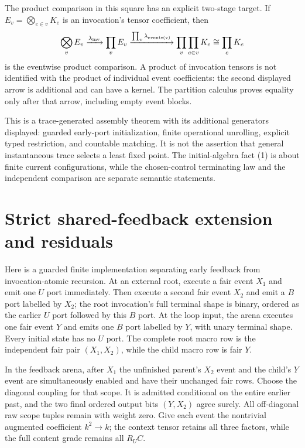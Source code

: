 \documentclass[11pt]{article}
\begin{document}
The product comparison in this square has an explicit two-stage target. If $E_v=\bigotimes_{e\in v}K_e$ is an invocation's tensor coefficient, then
\[
 \bigotimes_v E_v
 \xrightarrow{\lambda_{\rm inv}}\prod_v E_v
 \xrightarrow{\prod_v\lambda_{\rm events(v)}}
 \prod_v\prod_{e\in v}K_e\cong\prod_eK_e
\]
is the eventwise product comparison. A product of invocation tensors is not identified with the product of individual event coefficients: the second displayed arrow is additional and can have a kernel. The partition calculus proves equality only after that arrow, including empty event blocks.

This is a trace-generated assembly theorem with its additional generators displayed: guarded early-port initialization, finite operational unrolling, explicit typed restriction, and countable matching. It is not the assertion that general instantaneous trace selects a least fixed point. The initial-algebra fact (1) is about finite current configurations, while the chosen-control terminating law and the independent comparison are separate semantic statements.

\section{Strict shared-feedback extension and residuals}
Here is a guarded finite implementation separating early feedback from invocation-atomic recursion. At an external root, execute a fair event $X_1$ and emit one $U$ port immediately. Then execute a second fair event $X_2$ and emit a $B$ port labelled by $X_2$; the root invocation's full terminal shape is binary, ordered as the earlier $U$ port followed by this $B$ port. At the loop input, the arena executes one fair event $Y$ and emits one $B$ port labelled by $Y$, with unary terminal shape. Every initial state has no $U$ port. The complete root macro row is the independent fair pair $(X_1,X_2)$, while the child macro row is fair $Y$.

In the feedback arena, after $X_1$ the unfinished parent's $X_2$ event and the child's $Y$ event are simultaneously enabled and have their unchanged fair rows. Choose the diagonal coupling for that scope. It is admitted conditional on the entire earlier past, and the two final ordered output bits $(Y,X_2)$ agree surely. All off-diagonal raw scope tuples remain with weight zero. Give each event the nontrivial augmented coefficient $k^2\to k$; the context tensor retains all three factors, while the full content grade remains all $R_UC$.
\end{document}
